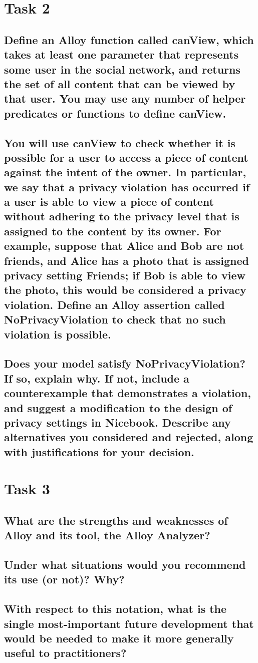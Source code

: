 \documentclass[titlepage]{article}
\begin{document}
\section{Task 2}
\subsection{Define an Alloy function called canView, which takes at least one parameter that represents some user in the
	social network, and returns the set of all content that can be viewed by that user. You may use any number of
	helper predicates or functions to define canView.}
\subsection{You will use canView to check whether it is possible for a user to access a piece of content against the intent of the owner. In particular, we say that a privacy violation has occurred if a user is able to view a piece of content without adhering to the privacy level that is assigned to the content by its owner. For example, suppose that Alice
	and Bob are not friends, and Alice has a photo that is assigned privacy setting Friends; if Bob is able to view the
	photo, this would be considered a privacy violation. Define an Alloy assertion called NoPrivacyViolation
	to check that no such violation is possible.}
\subsection{Does your model satisfy NoPrivacyViolation? If so, explain why. If not, include a counterexample that
	demonstrates a violation, and suggest a modification to the design of privacy settings in Nicebook. Describe
	any alternatives you considered and rejected, along with justifications for your decision.}

\section{Task 3}
\subsection{What are the strengths and weaknesses of Alloy and its tool, the Alloy Analyzer?}
\subsection{Under what situations would you recommend its use (or not)? Why?}
\subsection{With respect to this notation, what is the single most-important future development that would be needed to
	make it more generally useful to practitioners?}
\end{document}
